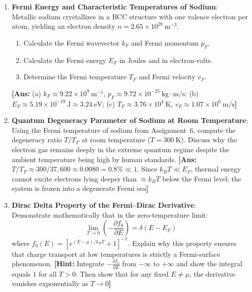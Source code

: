 \documentclass[11pt,a4paper]{article}
\begin{document}
\begin{enumerate}[label=\textbf{\arabic*.}, resume, leftmargin=*]
    \item \textbf{Fermi Energy and Characteristic Temperatures of Sodium}:\\
    Metallic sodium crystallizes in a BCC structure with one valence electron per atom, yielding an electron density $n = 2.65 \times 10^{28}\ \mathrm{m}^{-3}$.
    \begin{enumerate}[label=(\alph*)]
        \item Calculate the Fermi wavevector $k_F$ and Fermi momentum $p_F$.
        \item Calculate the Fermi energy $E_F$ in Joules and in electron-volts.
        \item Determine the Fermi temperature $T_F$ and Fermi velocity $v_F$.
    \end{enumerate}
    \textbf{[Ans:} (a) $k_F \approx 9.22 \times 10^9\ \mathrm{m^{-1}}$, $p_F \approx 9.72 \times 10^{-25}\ \mathrm{kg\cdot m/s}$; (b) $E_F \approx 5.19 \times 10^{-19}\ \mathrm{J} \approx 3.24\ \mathrm{eV}$; (c) $T_F \approx 3.76 \times 10^4\ \mathrm{K}$, $v_F \approx 1.07 \times 10^6\ \mathrm{m/s}$\textbf{]}

    \item \textbf{Quantum Degeneracy Parameter of Sodium at Room Temperature}:\\
    Using the Fermi temperature of sodium from Assignment~6, compute the degeneracy ratio $T/T_F$ at room temperature ($T = 300\ \mathrm{K}$). Discuss why the electron gas remains deeply in the extreme quantum regime despite the ambient temperature being high by human standards.
    \textbf{[Ans:} $T/T_F \approx 300 / 37{,}600 \approx 0.0080 = 0.8\% \ll 1$. Since $k_B T \ll E_F$, thermal energy cannot excite electrons lying deeper than $\approx k_B T$ below the Fermi level; the system is frozen into a degenerate Fermi sea\textbf{]}

    \item \textbf{Dirac Delta Property of the Fermi--Dirac Derivative}:\\
    Demonstrate mathematically that in the zero-temperature limit:
    \[
    \lim_{T \to 0} \left(-\frac{\partial f_0}{\partial E}\right) = \delta(E - E_F)
    \]
    where $f_0(E) = [e^{(E-\mu)/k_BT} + 1]^{-1}$. Explain why this property ensures that charge transport at low temperatures is strictly a Fermi-surface phenomenon.
    \textbf{[Hint:} Integrate $-\frac{\partial f_0}{\partial E}$ from $-\infty$ to $+\infty$ and show the integral equals $1$ for all $T > 0$. Then show that for any fixed $E \neq \mu$, the derivative vanishes exponentially as $T \to 0$\textbf{]}


\end{enumerate}
\end{document}
